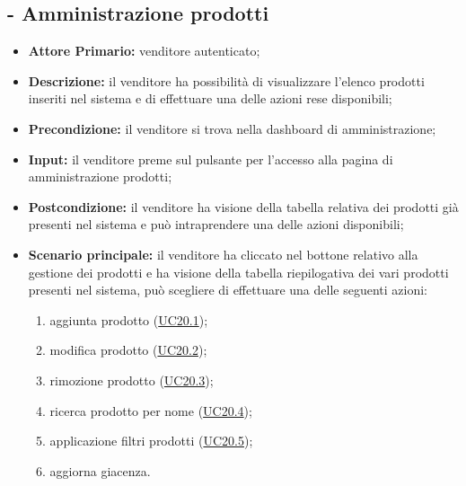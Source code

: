 \subsection{ - Amministrazione prodotti}
\begin{itemize}
    \item \textbf{Attore Primario:} venditore autenticato;
    \item \textbf{Descrizione:} il venditore ha possibilità di visualizzare l’elenco prodotti inseriti nel sistema e di effettuare una delle azioni rese disponibili;
    \item \textbf{Precondizione:} il venditore si trova nella dashboard di amministrazione;
    \item \textbf{Input:} il venditore preme sul pulsante per l'accesso alla pagina di amministrazione prodotti;
    \item \textbf{Postcondizione:} il venditore ha visione della tabella relativa dei prodotti già presenti nel sistema e può intraprendere una delle azioni disponibili;
    \item \textbf{Scenario principale:} il venditore ha cliccato nel bottone relativo alla gestione dei prodotti e ha visione della tabella riepilogativa dei vari prodotti presenti nel sistema, può scegliere di effettuare una delle seguenti azioni:
          \begin{enumerate}
              \item aggiunta prodotto (\hyperref[UC20.1]{UC20.1});
              \item modifica prodotto (\hyperref[UC20.2]{UC20.2});
              \item rimozione prodotto (\hyperref[UC20.3]{UC20.3});
              \item ricerca prodotto per nome (\hyperref[UC20.4]{UC20.4});
              \item applicazione filtri prodotti (\hyperref[UC20.5]{UC20.5});
              \item aggiorna giacenza.
          \end{enumerate}
\end{itemize}

\stepsubUserCase
